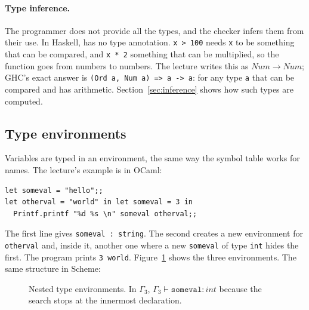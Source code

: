 \paragraph{Type inference.} The programmer does not provide all the types, and
the checker infers them from their use. In Haskell,
has no type annotation. \texttt{x > 100} needs \texttt{x} to be something that
can be compared, and \texttt{x * 2} something that can be multiplied, so the
function goes from numbers to numbers. The lecture writes this as
$\mathit{Num} \to \mathit{Num}$; GHC's exact answer is
\texttt{(Ord a, Num a) => a -> a}: for any type \texttt{a} that can be compared
and has arithmetic. Section~\ref{sec:inference} shows how such types are
computed.

\subsection{Type environments}

Variables are typed in an environment, the same way the symbol table works
for names. The lecture's example is in OCaml:
\begin{lstlisting}
let someval = "hello";;
let otherval = "world" in let someval = 3 in
  Printf.printf "%d %s \n" someval otherval;;
\end{lstlisting}
The first line gives \texttt{someval : string}. The second creates a new
environment for \texttt{otherval} and, inside it, another one where a new
\texttt{someval} of type \texttt{int} hides the first. The program prints
\texttt{3 world}. Figure~\ref{fig:tenv} shows the three environments. The same
structure in Scheme:

\begin{figure}[h]
\centering
{}
\caption{Nested type environments. In $\Gamma_3$, $\Gamma_3 \vdash \mathtt{someval} : \mathit{int}$ because the search stops at the innermost declaration.}
\label{fig:tenv}
\end{figure}

